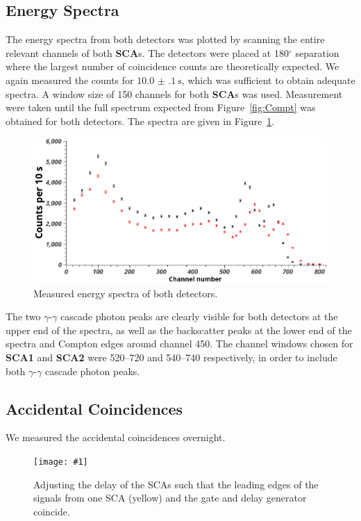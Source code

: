 \documentclass[twocolumn]{article}
\newcommand{\insertFigure}[1]{%
   \texttt{[image: \#1]}%
}
\begin{document}
\subsection{Energy Spectra}
The energy spectra from both detectors was plotted by scanning the entire relevant channels of both \textbf{SCA}s. The detectors were placed at 180$^{\circ}$ separation where the largest number of coincidence counts are theoretically expected. We again measured the counts for $\SI[separate-uncertainty = true]{10.0(1) }{\second}$, which was sufficient to obtain adequate spectra. A window size of 150 channels for both \textbf{SCA}s was used. Measurement were taken until the full spectrum expected from Figure~\ref{fig:Compt} was obtained for both detectors. The spectra are given in Figure~\ref{fig:spectra}.
\begin{figure}[!h]
	\centering
	\includegraphics[width=0.9\linewidth]{detectors2.png}
	\caption{Measured energy spectra of both detectors.}
	\label{fig:spectra}
\end{figure}
The two $\gamma$-$\gamma$ cascade photon peaks are clearly visible for both detectors at the upper end of the spectra, as well as the backscatter peaks at the lower end of the spectra and Compton edges around channel 450. The channel windows chosen for \textbf{SCA1} and \textbf{SCA2} were 520--720 and 540--740 respectively, in order to include both $\gamma$-$\gamma$ cascade photon peaks.

\subsection{Accidental Coincidences} \label{sec:acc}
We measured the accidental coincidences overnight. 


\begin{figure}
\centering
\insertFigure{./screenshots/SC07_cropped.png}
\caption{Adjusting the delay of the SCAs such that the leading edges of the signals from one SCA (yellow) and the gate and delay generator coincide.}
\label{fig:sca-overlap}
\end{figure}
\end{document}
